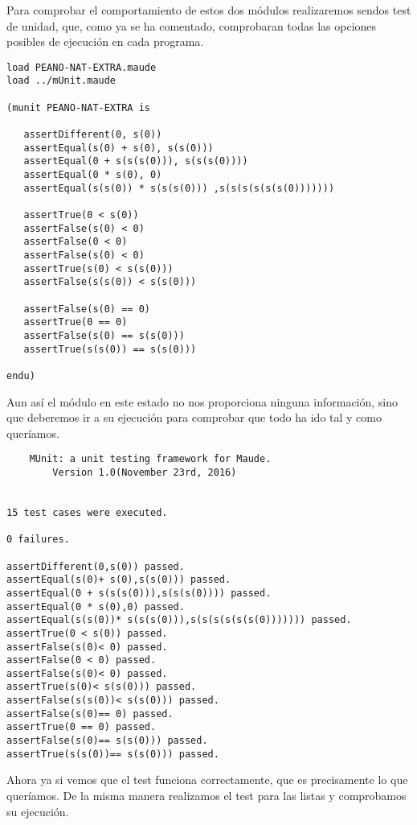 \documentclass[12pt,a4paper]{book}
\begin{document}
Para comprobar el comportamiento de estos dos m\'odulos realizaremos sendos test de unidad, que, como ya se ha comentado, comprobaran todas las opciones posibles de ejecuci\'on en cada programa. \par

\begin{verbatim}
load PEANO-NAT-EXTRA.maude
load ../mUnit.maude

(munit PEANO-NAT-EXTRA is

   assertDifferent(0, s(0))
   assertEqual(s(0) + s(0), s(s(0)))
   assertEqual(0 + s(s(s(0))), s(s(s(0))))
   assertEqual(0 * s(0), 0)
   assertEqual(s(s(0)) * s(s(s(0))) ,s(s(s(s(s(s(0)))))))

   assertTrue(0 < s(0))
   assertFalse(s(0) < 0)
   assertFalse(0 < 0)
   assertFalse(s(0) < 0)
   assertTrue(s(0) < s(s(0)))
   assertFalse(s(s(0)) < s(s(0)))
   
   assertFalse(s(0) == 0)
   assertTrue(0 == 0)
   assertFalse(s(0) == s(s(0)))
   assertTrue(s(s(0)) == s(s(0)))
   
endu)
\end{verbatim}

Aun as\' i el m\'odulo en este estado no nos proporciona ninguna informaci\'on, sino que deberemos ir a su ejecuci\'on para comprobar que todo ha ido tal y como quer\'iamos. \par

\begin{verbatim}
	MUnit: a unit testing framework for Maude.
		Version 1.0(November 23rd, 2016)


15 test cases were executed.

0 failures.

assertDifferent(0,s(0)) passed.
assertEqual(s(0)+ s(0),s(s(0))) passed.
assertEqual(0 + s(s(s(0))),s(s(s(0)))) passed.
assertEqual(0 * s(0),0) passed.
assertEqual(s(s(0))* s(s(s(0))),s(s(s(s(s(s(0))))))) passed.
assertTrue(0 < s(0)) passed.
assertFalse(s(0)< 0) passed.
assertFalse(0 < 0) passed.
assertFalse(s(0)< 0) passed.
assertTrue(s(0)< s(s(0))) passed.
assertFalse(s(s(0))< s(s(0))) passed.
assertFalse(s(0)== 0) passed.
assertTrue(0 == 0) passed.
assertFalse(s(0)== s(s(0))) passed.
assertTrue(s(s(0))== s(s(0))) passed.
\end{verbatim}

Ahora ya si vemos que el test funciona correctamente, que es precisamente lo que quer\'iamos. De la misma manera realizamos el test para las listas y comprobamos su ejecuci\'on. \par
\end{document}
